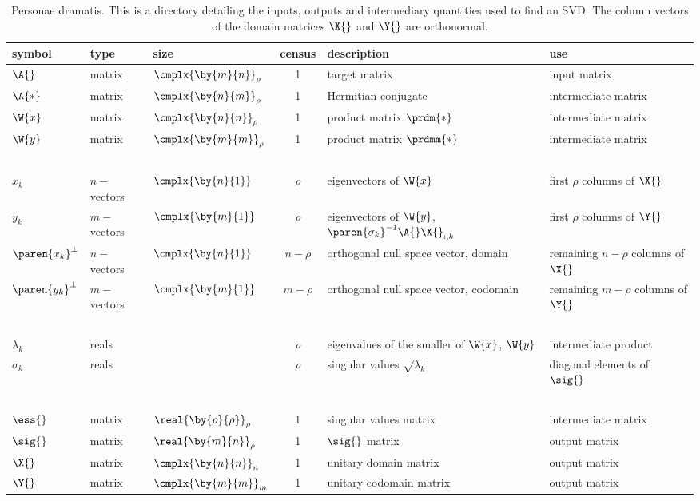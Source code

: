 \begin{landscape}
\begin{table}[p]
\begin{center}
\begin{tabular}{lllcll}
 symbol & type & size & census & description & use \\\hline
 $\A{}$ & matrix & $\cmplx{\by{m}{n}}_{\rho}$ & 1 & target matrix  & input matrix \\
 $\A{*}$ & matrix & $\cmplx{\by{n}{m}}_{\rho}$ & 1 & Hermitian conjugate & intermediate matrix\\ 
 $\W{x}$ & matrix & $\cmplx{\by{n}{n}}_{\rho}$ & 1 & product matrix $\prdm{*}$ & intermediate matrix\\
 $\W{y}$ & matrix & $\cmplx{\by{m}{m}}_{\rho}$ & 1 & product matrix $\prdmm{*}$ & intermediate matrix \\
 \ &&& \\
 $x_{k}$ & $n-$vectors & $\cmplx{\by{n}{1}}$ & $\rho$ & eigenvectors of $\W{x}$ & first $\rho$ columns of $\X{}$ \\
 $y_{k}$ & $m-$vectors & $\cmplx{\by{m}{1}}$ & $\rho$ & eigenvectors of $\W{y}$, $\paren{\sigma_{k}}^{-1}\A{}\X{}_{:,k}$ & first $\rho$ columns of $\Y{}$ \\
 $\paren{x_{k}}^{\perp}$ & $n-$vectors & $\cmplx{\by{n}{1}}$ & $n-\rho$ & orthogonal null space vector, domain & remaining $n-\rho$ columns of $\X{}$ \\
 $\paren{y_{k}}^{\perp}$ & $m-$vectors & $\cmplx{\by{m}{1}}$ & $m-\rho$ & orthogonal null space vector, codomain & remaining $m-\rho$ columns of $\Y{}$ \\
 \ &&& \\
 $\lambda_{k}$ & reals && $\rho$ & eigenvalues of the smaller of $\W{x}$, $\W{y}$ &intermediate product \\
 $\sigma_{k}$ & reals && $\rho$ & singular values $\sqrt{\lambda_{k}}$ & diagonal elements of $\sig{}$\\
 \ &&& \\
  $\ess{}$ & matrix & $\real{\by{\rho}{\rho}}_{\rho}$ & 1 & singular values matrix & intermediate matrix \\
  $\sig{}$ & matrix & $\real{\by{m}{n}}_{\rho}$ & 1 & $\sig{}$ matrix & output matrix \\
  $\X{}$ & matrix & $\cmplx{\by{n}{n}}_{n}$ & 1 & unitary domain matrix & output matrix \\
  $\Y{}$ & matrix & $\cmplx{\by{m}{m}}_{m}$ & 1 & unitary codomain matrix & output matrix \\
[10pt]
\end{tabular}
\end{center}
\label{tab:3:personaedramatis}
\caption[Personae dramatis]{Personae dramatis. This is a directory detailing the inputs, outputs and intermediary quantities used to find an SVD. The column vectors of the domain matrices $\X{}$ and $\Y{}$ are orthonormal.}
\end{table}


\end{landscape}
